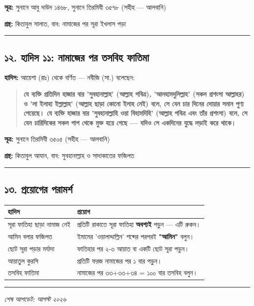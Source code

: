 \textbf{সূত্র:} সুনানে আবু দাউদ ১৪৬৮, সুনানে তিরমিযী ৩৫৭৮ (সহীহ — আলবানি)

\textbf{গ্রন্থ:} কিতাবুল সালাত, বাব: নামাজের পর সূরা ইখলাস পড়া

\medskip\hrule\medskip

\subsection*{১২. হাদিস ১১: নামাজের পর তসবিহ ফাতিমা}

\textbf{হাদিস:} আয়েশা (রাঃ) থেকে বর্ণিত — নবীজি (সা.) বলেছেন:

\begin{quote}
\textbf{যে ব্যক্তি প্রতিদিন হাজার বার 'সুবহানাল্লাহ' (আল্লাহ পবিত্র), 'আলহামদুলিল্লাহ' (সকল প্রশংসা আল্লাহর) ও 'লা ইলাহা ইল্লাল্লাহ' (আল্লাহ ছাড়া কোনো ইলাহ নেই) বলে, সে যেন চার দিনের দোয়ার সমান পুণ্য পেয়েছে। যে ব্যক্তি হাজার বার 'সুবহানাল্লাহি ওয়া বিহামদিহি' (আল্লাহ পবিত্র এবং তাঁর প্রশংসা) বলে, সে যেন চারিদিকের সকল পাপ থেকে মুক্ত হয়ে গেছে — যদিও সে একদিনের যুদ্ধে লড়াই করে থাকে।}
\end{quote}

\textbf{সূত্র:} সুনানে তিরমিযী ৩৫০৫ (সহীহ — আলবানি)

\textbf{গ্রন্থ:} কিতাবুল আযান, বাব: সুবহানাল্লাহ ও সাদাকাতের ফজিলত

\medskip\hrule\medskip

\subsection*{১৩. প্রয়োগের পরামর্শ}

\begin{table}[h]\centering\small
\begin{tabular}{ll}
হাদিস & প্রয়োগ \\
\hline
সূরা ফাতিহা ছাড়া নামাজ নেই & প্রতিটি রাকাতে সূরা ফাতিহা \textbf{অবশ্যই} পড়ুন — এটি রুকন। \\
আমিন বলার ফজিলত & ইমামের 'ওয়ালাদ্দাল্লিন' শব্দের পরপরই \textbf{"আমিন"} বলুন। \\
ছোট সূরা পড়ার মর্যাদা & ফাতিহার পর ২-৩ আয়াত বা একটি ছোট সূরা পড়ুন। \\
আয়াতুল কুরসি & প্রতিটি ফরজ নামাজের পর ১ বার পড়ুন। \\
তসবিহ ফাতিমা & নামাজের পর ৩৩+৩৩+৩৪ = ১০০ বার তসবিহ বলুন। \\
\hline
\end{tabular}
\end{table}

\medskip\hrule\medskip

\textit{শেষ আপডেট: আগস্ট ২০২৬}


